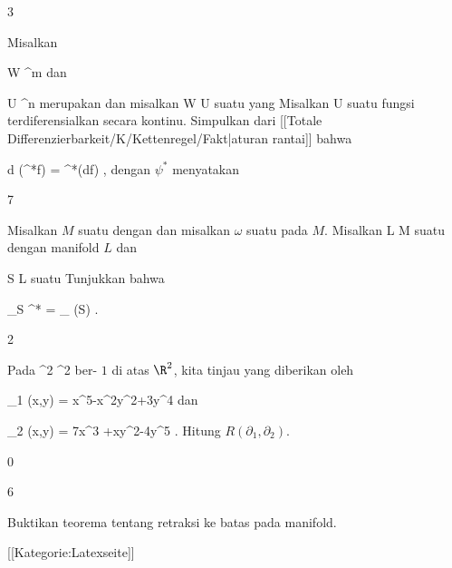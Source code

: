 {3}
{

Misalkan

\mavergleichskette
{\vergleichskette
{ W
}
{ \subseteq }{ \R^m
}
{  }{
}
{    }{
}
{   }{
}
}
{}{}{}
dan

\mavergleichskette
{\vergleichskette
{ U
}
{ \subseteq }{ \R^n
}
{  }{
}
{    }{
}
{   }{
}
}
{}{}{}
merupakan
dan misalkan
\maabbdisp {\psi} { W } { U
} {}
suatu
yang
Misalkan
 { U } {\R
} {}
suatu fungsi terdiferensialkan secara kontinu. Simpulkan dari
[[Totale Differenzierbarkeit/K/Kettenregel/Fakt|aturan rantai]]
bahwa

\mavergleichskettedisp
{\vergleichskette
{ d (\psi^*f)
}
{ =} { \psi^*(df)
}
{ } {
}
{ } {
}
{ } {
}
}
{}{}{,}
dengan $\psi^*$ menyatakan

}
{} {}

{7}
{

Misalkan $M$ suatu
dengan
dan misalkan $\omega$ suatu
pada $M$. Misalkan
\maabbdisp {\varphi} { L } { M
} {}
suatu
dengan manifold $L$ dan

\mavergleichskette
{\vergleichskette
{ S
}
{ \subseteq }{ L
}
{  }{
}
{    }{
}
{   }{
}
}
{}{}{}
suatu
Tunjukkan bahwa

\mavergleichskettedisp
{\vergleichskette
{ \int_S \varphi^* \omega
}
{ =} { \int_{ \varphi(S)} \omega
}
{ } {
}
{ } {
}
{ } {
}
}
{}{}{.}

}
{} {}

{2}
{

Pada
 {\R^2 \times \R} { \R^2
} {}
ber-
$1$ di atas $\R^2$, kita tinjau
yang diberikan oleh

\mavergleichskette
{\vergleichskette
{ \Gamma_1 (x,y)
}
{ = }{ x^5-x^2y^2+3y^4
}
{  }{
}
{    }{
}
{   }{
}
}
{}{}{}
dan

\mavergleichskette
{\vergleichskette
{ \Gamma_2 (x,y)
}
{ = }{ 7x^3 +xy^2-4y^5
}
{  }{
}
{    }{
}
{   }{
}
}
{}{}{.}
Hitung
$R \left(  \partial_1, \partial_2  \right)$.

}
{} {}

{0}
{

}
{} {}

{6}
{

Buktikan teorema tentang retraksi ke batas pada manifold.

}
{} {}

 [[Kategorie:Latexseite]]
